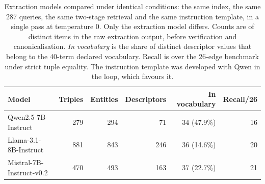 \begin{table}[htbp]
\centering
\caption{Extraction models compared under identical conditions:
the same index, the same 287 queries, the same two-stage retrieval
and the same instruction template, in a single pass at temperature 0.
Only the extraction model differs. Counts are of distinct items in the
raw extraction output, before verification and canonicalisation.
\emph{In vocabulary} is the share of distinct descriptor values that
belong to the 40-term declared vocabulary. Recall is over the 26-edge
benchmark under strict tuple equality. The instruction template was
developed with Qwen in the loop, which favours it.}
\label{tab:model-comparison}
\begin{tabular}{lrrrrr}
\hline
Model & Triples & Entities & Descriptors & In vocabulary & Recall/26 \\
\hline
Qwen2.5-7B-Instruct & 279 & 294 & 71 & 34 (47.9\%) & 16 \\
Llama-3.1-8B-Instruct & 881 & 843 & 246 & 36 (14.6\%) & 20 \\
Mistral-7B-Instruct-v0.2 & 470 & 493 & 163 & 37 (22.7\%) & 21 \\
\hline
\end{tabular}
\end{table}